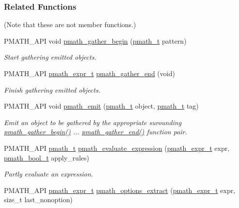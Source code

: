 \subsubsection*{Related Functions}
(Note that these are not member functions.) \begin{CompactItemize}
\item 
PMATH\_\-API void \hyperlink{group__helpers_g077f3730ca4275b87d9a35bce6013e45}{pmath\_\-gather\_\-begin} (\hyperlink{classpmath__t}{pmath\_\-t} pattern)
\begin{CompactList}\small\item\em Start gathering emitted objects. \item\end{CompactList}\item 
PMATH\_\-API \hyperlink{classpmath__expr__t}{pmath\_\-expr\_\-t} \hyperlink{group__helpers_ga2f732b35703986263e3a15592b4a46e}{pmath\_\-gather\_\-end} (void)
\begin{CompactList}\small\item\em Finish gathering emitted objects. \item\end{CompactList}\item 
PMATH\_\-API void \hyperlink{group__helpers_ga06135012f4d2a0faf696c0cd1111075}{pmath\_\-emit} (\hyperlink{classpmath__t}{pmath\_\-t} object, \hyperlink{classpmath__t}{pmath\_\-t} tag)
\begin{CompactList}\small\item\em Emit an object to be gathered by the appropriate surounding \hyperlink{group__helpers_g077f3730ca4275b87d9a35bce6013e45}{pmath\_\-gather\_\-begin()} ... \hyperlink{group__helpers_ga2f732b35703986263e3a15592b4a46e}{pmath\_\-gather\_\-end()} function pair. \item\end{CompactList}\item 
PMATH\_\-API \hyperlink{classpmath__t}{pmath\_\-t} \hyperlink{classpmath__expr__t_d723e196e3d7f9078729bc0fb2fe7eed}{pmath\_\-evaluate\_\-expression} (\hyperlink{classpmath__expr__t}{pmath\_\-expr\_\-t} expr, \hyperlink{group__general__types_gc92090cb0b56345d6c379ed2341d4ef4}{pmath\_\-bool\_\-t} apply\_\-rules)
\begin{CompactList}\small\item\em Partly evaluate an expression. \item\end{CompactList}\item 
PMATH\_\-API \hyperlink{classpmath__expr__t}{pmath\_\-expr\_\-t} \hyperlink{group__helpers_g24403dfbd825b17fc4c6da5973922184}{pmath\_\-options\_\-extract} (\hyperlink{classpmath__expr__t}{pmath\_\-expr\_\-t} expr, size\_\-t last\_\-nonoption)

\end{CompactItemize}
